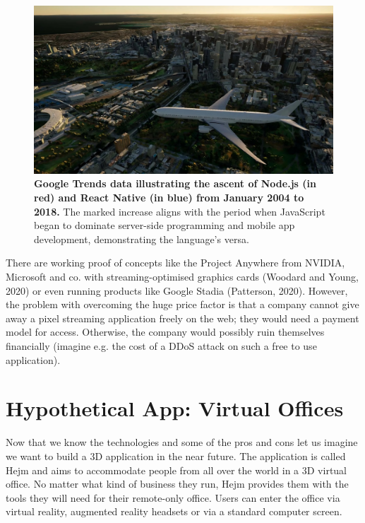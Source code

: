 \documentclass[10pt]{article}
\begin{document}
\begin{sloppypar}
  \begin{figure}[ht]
    \centering
    \includegraphics[width=\textwidth]{figures/project-anywhere.jpg}
    \caption[Google Trends data illustrating the ascent of Node.js and React Native.]{\textbf{Google Trends data illustrating the ascent of Node.js (in red) and React Native (in blue) from January 2004 to 2018.} The marked increase aligns with the period when JavaScript began to dominate server-side programming and mobile app development, demonstrating the language’s versa.}
    \label{fig:project-anywhere}
  \end{figure}

  There are working proof of concepts like the Project Anywhere from NVIDIA, Microsoft and co. with streaming-optimised graphics cards (Woodard and Young, 2020) or even running products like Google Stadia (Patterson, 2020). However, the problem with overcoming the huge price factor is that a company cannot give away a pixel streaming application freely on the web; they would need a payment model for access. Otherwise, the company would possibly ruin themselves financially (imagine e.g. the cost of a DDoS attack on such a free to use application).

  \section{Hypothetical App: Virtual Offices}
  \label{sec:hypothetical-app-virtual-offices}

  Now that we know the technologies and some of the pros and cons let us imagine we want to build a 3D application in the near future. The application is called Hejm and aims to accommodate people from all over the world in a 3D virtual office. No matter what kind of business they run, Hejm provides them with the tools they will need for their remote-only office. Users can enter the office via virtual reality, augmented reality headsets or via a standard computer screen.


\end{sloppypar}
\end{document}
